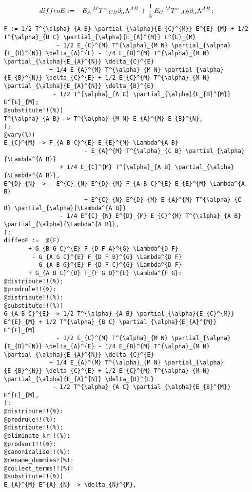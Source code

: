 \documentclass[11pt]{article}
\def\specialcolon{\mathrel{\mathop{:}}\hspace{-.5em}}
\begin{document}
\begin{dmath*}[compact, spread=2pt]
diffeoE\specialcolon{}=  - {E}_{A}\,^{M} {T}^{\alpha}\,_{C B} {\partial}_{\alpha}{{\Lambda}^{A B}}\,  + \frac{1}{4}\, {E}_{C}\,^{M} {T}^{\alpha}\,_{A B} {\partial}_{\alpha}{{\Lambda}^{A B}}\, ;
\end{dmath*}
{\color[named]{Blue}\begin{verbatim}
F := 1/2 T^{\alpha}_{A B} \partial_{\alpha}{E_{C}^{M}} E^{E}_{M} + 1/2 T^{\alpha}_{B C} \partial_{\alpha}{E_{A}^{M}} E^{E}_{M}
               - 1/2 E_{C}^{M} T^{\alpha}_{M N} \partial_{\alpha}{E_{B}^{N}} \delta_{A}^{E} - 1/4 E_{B}^{M} T^{\alpha}_{M N} \partial_{\alpha}{E_{A}^{N}} \delta_{C}^{E}
             + 1/4 E_{A}^{M} T^{\alpha}_{M N} \partial_{\alpha}{E_{B}^{N}} \delta_{C}^{E} + 1/2 E_{C}^{M} T^{\alpha}_{M N} \partial_{\alpha}{E_{A}^{N}} \delta_{B}^{E}
              - 1/2 T^{\alpha}_{A C} \partial_{\alpha}{E_{B}^{M}} E^{E}_{M};
@substitute!!(%)(
T^{\alpha}_{A B} -> T^{\alpha}_{M N} E_{A}^{M} E_{B}^{N},
);
@vary(%)(
E_{C}^{M} -> F_{A B C}^{E} E_{E}^{M} \Lambda^{A B} 
                       - E_{A}^{M} T^{\alpha}_{C B} \partial_{\alpha}{\Lambda^{A B}}
                + 1/4 E_{C}^{M} T^{\alpha}_{A B} \partial_{\alpha}{\Lambda^{A B}},
E^{D}_{N} -> - E^{C}_{N} E^{D}_{M} F_{A B C}^{E} E_{E}^{M} \Lambda^{A B} 
                       + E^{C}_{N} E^{D}_{M} E_{A}^{M} T^{\alpha}_{C B} \partial_{\alpha}{\Lambda^{A B}}
                - 1/4 E^{C}_{N} E^{D}_{M} E_{C}^{M} T^{\alpha}_{A B} \partial_{\alpha}{\Lambda^{A B}},
):
diffeoF :=  @(F)
       + G_{B G C}^{E} F_{D F A}^{G} \Lambda^{D F}
        - G_{A G C}^{E} F_{D F B}^{G} \Lambda^{D F}
        - G_{A B G}^{E} F_{D F C}^{G} \Lambda^{D F}
       + G_{A B C}^{D} F_{F G D}^{E} \Lambda^{F G}:
@distribute!!(%):
@prodrule!!(%):
@distribute!!(%):
@substitute!!(%)(
G_{A B C}^{E} -> 1/2 T^{\alpha}_{A B} \partial_{\alpha}{E_{C}^{M}} E^{E}_{M} + 1/2 T^{\alpha}_{B C} \partial_{\alpha}{E_{A}^{M}} E^{E}_{M}
               - 1/2 E_{C}^{M} T^{\alpha}_{M N} \partial_{\alpha}{E_{B}^{N}} \delta_{A}^{E} - 1/4 E_{B}^{M} T^{\alpha}_{M N} \partial_{\alpha}{E_{A}^{N}} \delta_{C}^{E}
             + 1/4 E_{A}^{M} T^{\alpha}_{M N} \partial_{\alpha}{E_{B}^{N}} \delta_{C}^{E} + 1/2 E_{C}^{M} T^{\alpha}_{M N} \partial_{\alpha}{E_{A}^{N}} \delta_{B}^{E}
              - 1/2 T^{\alpha}_{A C} \partial_{\alpha}{E_{B}^{M}} E^{E}_{M},
):
@distribute!!(%):
@prodrule!!(%):
@distribute!!(%):
@eliminate_kr!!(%):
@prodsort!!(%):
@canonicalise!!(%):
@rename_dummies!(%):
@collect_terms!!(%):
@substitute!!(%)(
E_{A}^{M} E^{A}_{N} -> \delta_{N}^{M},

\end{verbatim}}
\end{document}

